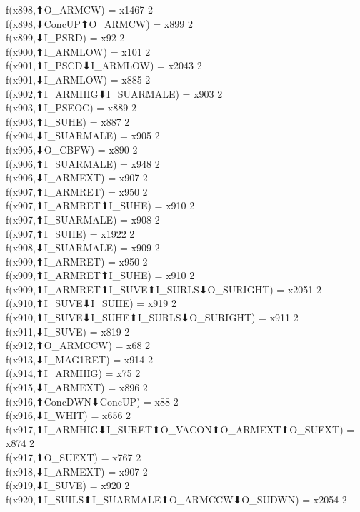 f(x898,⬆O_ARMCW) = x1467 {2} \\
f(x898,⬇ConcUP⬆O_ARMCW) = x899 {2} \\
f(x899,⬇I_PSRD) = x92 {2} \\
f(x900,⬆I_ARMLOW) = x101 {2} \\
f(x901,⬆I_PSCD⬇I_ARMLOW) = x2043 {2} \\
f(x901,⬇I_ARMLOW) = x885 {2} \\
f(x902,⬆I_ARMHIG⬇I_SUARMALE) = x903 {2} \\
f(x903,⬆I_PSEOC) = x889 {2} \\
f(x903,⬆I_SUHE) = x887 {2} \\
f(x904,⬇I_SUARMALE) = x905 {2} \\
f(x905,⬇O_CBFW) = x890 {2} \\
f(x906,⬆I_SUARMALE) = x948 {2} \\
f(x906,⬇I_ARMEXT) = x907 {2} \\
f(x907,⬆I_ARMRET) = x950 {2} \\
f(x907,⬆I_ARMRET⬆I_SUHE) = x910 {2} \\
f(x907,⬆I_SUARMALE) = x908 {2} \\
f(x907,⬆I_SUHE) = x1922 {2} \\
f(x908,⬇I_SUARMALE) = x909 {2} \\
f(x909,⬆I_ARMRET) = x950 {2} \\
f(x909,⬆I_ARMRET⬆I_SUHE) = x910 {2} \\
f(x909,⬆I_ARMRET⬆I_SUVE⬆I_SURLS⬇O_SURIGHT) = x2051 {2} \\
f(x910,⬆I_SUVE⬇I_SUHE) = x919 {2} \\
f(x910,⬆I_SUVE⬇I_SUHE⬆I_SURLS⬇O_SURIGHT) = x911 {2} \\
f(x911,⬇I_SUVE) = x819 {2} \\
f(x912,⬆O_ARMCCW) = x68 {2} \\
f(x913,⬇I_MAG1RET) = x914 {2} \\
f(x914,⬆I_ARMHIG) = x75 {2} \\
f(x915,⬇I_ARMEXT) = x896 {2} \\
f(x916,⬆ConcDWN⬇ConcUP) = x88 {2} \\
f(x916,⬇I_WHIT) = x656 {2} \\
f(x917,⬆I_ARMHIG⬇I_SURET⬆O_VACON⬆O_ARMEXT⬆O_SUEXT) = x874 {2} \\
f(x917,⬆O_SUEXT) = x767 {2} \\
f(x918,⬇I_ARMEXT) = x907 {2} \\
f(x919,⬇I_SUVE) = x920 {2} \\
f(x920,⬆I_SUILS⬆I_SUARMALE⬆O_ARMCCW⬇O_SUDWN) = x2054 {2} \\
